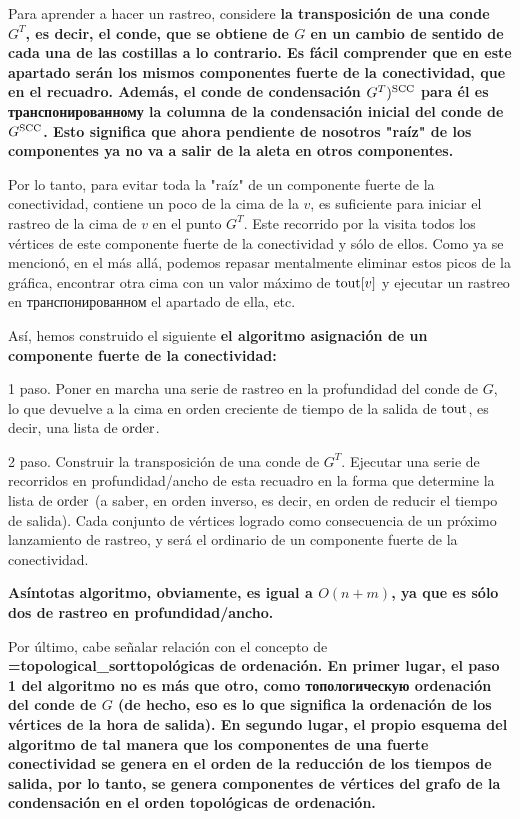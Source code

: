 Para aprender a hacer un rastreo, considere \bf{la transposición de una conde} $G^T$, es decir, el conde, que se obtiene de $G$ en un cambio de sentido de cada una de las costillas a lo contrario. Es fácil comprender que en este apartado serán los mismos componentes fuerte de la conectividad, que en el recuadro. Además, el conde de condensación $G^T)^{\rm SCC}$ para él es транспонированному la columna de la condensación inicial del conde de $G^{\rm SCC}$. Esto significa que ahora pendiente de nosotros "raíz" de los componentes ya no va a salir de la aleta en otros componentes.

Por lo tanto, para evitar toda la "raíz" de un componente fuerte de la conectividad, contiene un poco de la cima de la $v$, es suficiente para iniciar el rastreo de la cima de $v$ en el punto $G^T$. Este recorrido por la visita todos los vértices de este componente fuerte de la conectividad y sólo de ellos. Como ya se mencionó, en el más allá, podemos repasar mentalmente eliminar estos picos de la gráfica, encontrar otra cima con un valor máximo de ${\rm tout}[v]$ y ejecutar un rastreo en транспонированном el apartado de ella, etc.

Así, hemos construido el siguiente \bf{el algoritmo} asignación de un componente fuerte de la conectividad:

1 paso. Poner en marcha una serie de rastreo en la profundidad del conde de $G$, lo que devuelve a la cima en orden creciente de tiempo de la salida de ${\rm tout}$, es decir, una lista de $\rm order$.

2 paso. Construir la transposición de una conde de $G^T$. Ejecutar una serie de recorridos en profundidad/ancho de esta recuadro en la forma que determine la lista de $\rm order$ (a saber, en orden inverso, es decir, en orden de reducir el tiempo de salida). Cada conjunto de vértices logrado como consecuencia de un próximo lanzamiento de rastreo, y será el ordinario de un componente fuerte de la conectividad.

\bf{Asíntotas} algoritmo, obviamente, es igual a $O(n+m)$, ya que es sólo dos de rastreo en profundidad/ancho.

Por último, cabe señalar relación con el concepto de \bf{\algohref=topological_sort{topológicas de ordenación}}. En primer lugar, el paso 1 del algoritmo no es más que otro, como топологическую ordenación del conde de $G$ (de hecho, eso es lo que significa la ordenación de los vértices de la hora de salida). En segundo lugar, el propio esquema del algoritmo de tal manera que los componentes de una fuerte conectividad se genera en el orden de la reducción de los tiempos de salida, por lo tanto, se genera componentes de vértices del grafo de la condensación en el orden topológicas de ordenación.

